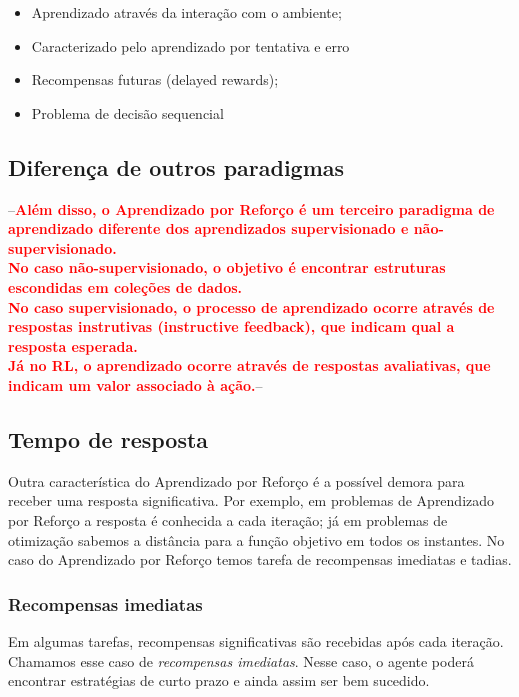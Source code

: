 \documentclass{article}
\newcommand{\todo}[1]{ --\textcolor{red}{\textbf{#1}}--}
\begin{document}
        \begin{itemize}
            \item Aprendizado através da interação com o ambiente;
            \item Caracterizado pelo aprendizado por tentativa e erro
            \item Recompensas futuras (delayed rewards);
            \item Problema de decisão sequencial
        \end{itemize}
        
        \subsection{Diferença de outros paradigmas}
        
            \todo{Além disso, o Aprendizado por Reforço é um terceiro paradigma de aprendizado diferente dos aprendizados supervisionado e não-supervisionado.\\
            No caso não-supervisionado, o objetivo é encontrar estruturas escondidas em coleções de dados.\\
            No caso supervisionado, o processo de aprendizado ocorre através de respostas instrutivas (instructive feedback), que indicam qual a resposta esperada.\\
            Já no RL, o aprendizado ocorre através de respostas avaliativas, que indicam um valor associado à ação.}
            
        \subsection{Tempo de resposta}
        
            Outra característica do Aprendizado por Reforço é a possível demora para receber uma resposta significativa. Por exemplo, em problemas de Aprendizado por Reforço a resposta é conhecida a cada iteração; já em problemas de otimização sabemos a distância para a função objetivo em todos os instantes. No caso do Aprendizado por Reforço temos tarefa de recompensas imediatas e tadias.
        
            \subsubsection{Recompensas imediatas}
        
                Em algumas tarefas, recompensas significativas são recebidas após cada iteração. Chamamos esse caso de \emph{recompensas imediatas}. Nesse caso, o agente poderá encontrar estratégias de curto prazo e ainda assim ser bem sucedido.
        
\end{document}
